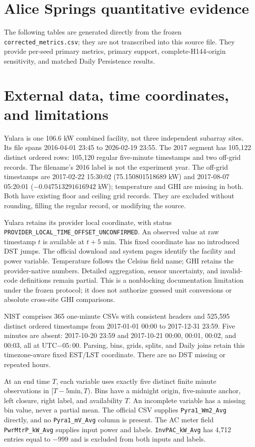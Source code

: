 \section{Alice Springs quantitative evidence}
The following tables are generated directly from the frozen \texttt{corrected\_metrics.csv}; they are not transcribed into this source file. They provide per-seed primary metrics, primary support, complete-H144-origin sensitivity, and matched Daily Persistence results.




\clearpage
\section{External data, time coordinates, and limitations}
Yulara is one 106.6 kW combined facility, not three independent subarray sites. Its file spans 2016-04-01 23:45 to 2026-02-19 23:55. The 2017 segment has 105,122 distinct ordered rows: 105,120 regular five-minute timestamps and two off-grid records. The filename's 2016 label is not the experiment year. The off-grid timestamps are 2017-02-22 15:30:02 (75.150801518689 kW) and 2017-08-07 05:20:01 ($-0.047513291616942$ kW); temperature and GHI are missing in both. Both have existing floor and ceiling grid records. They are excluded without rounding, filling the regular record, or modifying the source.

Yulara retains its provider local coordinate, with status \texttt{PROVIDER\_LOCAL\_TIME\_OFFSET\_UNCONFIRMED}. An observed value at raw timestamp $t$ is available at $t+5$ min. This fixed coordinate has no introduced DST jumps. The official download and system pages identify the facility and power variable. Temperature follows the Celsius field name; GHI retains the provider-native numbers. Detailed aggregation, sensor uncertainty, and invalid-code definitions remain partial. This is a nonblocking documentation limitation under the frozen protocol; it does not authorize guessed unit conversions or absolute cross-site GHI comparisons.

NIST comprises 365 one-minute CSVs with consistent headers and 525,595 distinct ordered timestamps from 2017-01-01 00:00 to 2017-12-31 23:59. Five minutes are absent: 2017-10-20 23:59 and 2017-10-21 00:00, 00:01, 00:02, and 00:03, all at UTC$-05{:}00$. Parsing, bins, grids, splits, and Daily joins retain this timezone-aware fixed EST/LST coordinate. There are no DST missing or repeated hours.

At an end time $T$, each variable uses exactly five distinct finite minute observations in $[T-5\mathrm{min},T)$. Bins have a midnight origin, five-minute anchor, left closure, right label, and availability $T$. An incomplete variable has a missing bin value, never a partial mean. The official CSV supplies \texttt{Pyra1\_Wm2\_Avg} directly, and no \texttt{Pyra1\_mV\_Avg} column is present. The AC meter field \texttt{PwrMtrP\_kW\_Avg} supplies input power and labels. \texttt{InvPAC\_kW\_Avg} has 4,712 entries equal to $-999$ and is excluded from both inputs and labels.


